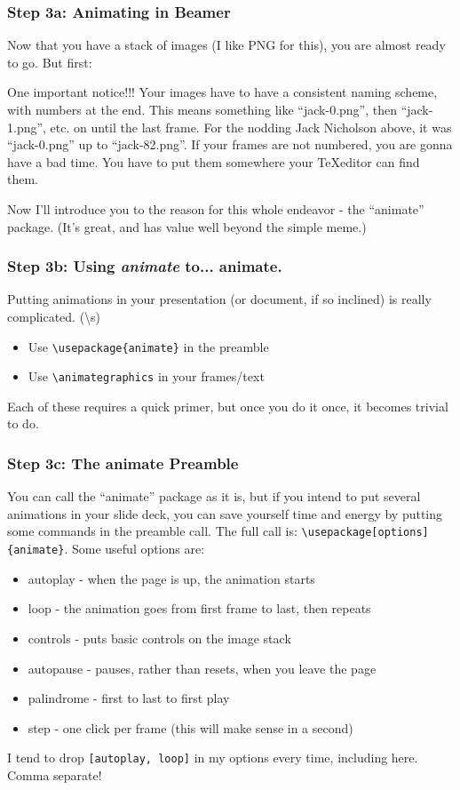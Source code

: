 \documentclass{beamer}
\begin{document}
\begin{frame}\hypertarget{STEP3a}{}
	\frametitle{Step 3a: Animating in Beamer}
	Now that you have a stack of images (I like PNG for this), you are almost ready to go. But first:
	\begin{block}{One important notice!!!}
		Your images have to have a consistent naming scheme, with numbers at the end. This means something like ``jack-0.png'', then ``jack-1.png'', etc. on until the last frame. For the nodding Jack Nicholson above, it was ``jack-0.png'' up to ``jack-82.png''. If your frames are not numbered, you are gonna have a bad time. You have to put them somewhere your \TeX editor can find them.
	\end{block}
	Now I'll introduce you to the reason for this whole endeavor - the ``animate'' package. (It's great, and has value well beyond the simple meme.)
\end{frame}

\begin{frame}[fragile]
	\frametitle{Step 3b: Using \emph{animate} to... animate.}
	Putting animations in your presentation (or document, if so inclined) is really complicated. (\textbackslash s)
		\begin{itemize}
			\item Use \verb+\usepackage{animate}+ in the preamble
			\item Use \verb+\animategraphics+ in your frames/text
		\end{itemize}
	Each of these requires a quick primer, but once you do it once, it becomes trivial to do.
\end{frame}

\begin{frame}[fragile]
	\frametitle{Step 3c: The animate Preamble}
	You can call the ``animate'' package as it is, but if you intend to put several animations in your slide deck, you can save yourself time and energy by putting some commands in the preamble call. The full call is: \verb+\usepackage[options]{animate}+. Some useful options are:
		\begin{itemize}
			\item autoplay - when the page is up, the animation starts
			\item loop - the animation goes from first frame to last, then repeats
			\item controls - puts basic controls on the image stack
			\item autopause - pauses, rather than resets, when you leave the page
			\item palindrome - first to last to first play
			\item step - one click per frame (this will make sense in a second)
		\end{itemize}
	I tend to drop \verb+[autoplay, loop]+ in my options every time, including here. Comma separate!
\end{frame}
\end{document}
